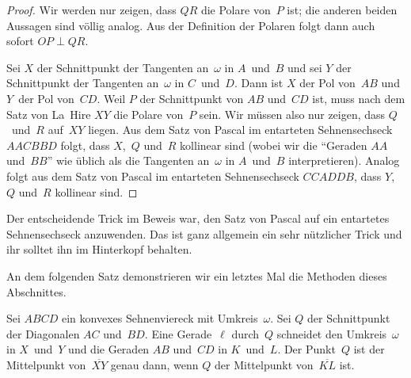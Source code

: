 \begin{proof}
	Wir werden nur zeigen, dass $QR$ die Polare von~$P$ ist; die anderen beiden Aussagen sind völlig analog. Aus der Definition der Polaren folgt dann auch sofort $OP\perp QR$.
	
	Sei $X$ der Schnittpunkt der Tangenten an~$\omega$ in $A$~und~$B$ und sei $Y$ der Schnittpunkt der Tangenten an~$\omega$ in $C$~und~$D$. Dann ist $X$ der Pol von~$AB$ und $Y$~der Pol von~$CD$. Weil $P$ der Schnittpunkt von $AB$ und~$CD$ ist, muss nach dem Satz von La~Hire $XY$ die Polare von~$P$ sein. Wir müssen also nur zeigen, dass $Q$~und~$R$ auf~$XY$ liegen. Aus dem Satz von Pascal im entarteten Sehnensechseck $AACBBD$ folgt, dass $X$,~$Q$ und~$R$ kollinear sind (wobei wir die \enquote{Geraden $AA$ und~$BB$} wie üblich als die Tangenten an~$\omega$ in $A$~und~$B$ interpretieren). Analog folgt aus dem Satz von Pascal im entarteten Sehnensechseck $CCADDB$, dass $Y$,~$Q$ und~$R$ kollinear sind.
\end{proof}

Der entscheidende Trick im Beweis war, den Satz von Pascal auf ein entartetes Sehnensechseck anzuwenden. Das ist ganz allgemein ein sehr nützlicher Trick und ihr solltet ihn im Hinterkopf behalten.

An dem folgenden Satz demonstrieren wir ein letztes Mal die Methoden dieses Abschnittes.

\begin{satzmitnamen}[Schmetterlingssatz]
	Sei $ABCD$ ein konvexes Sehnenviereck mit Umkreis~$\omega$. Sei $Q$ der Schnittpunkt der Diagonalen $AC$ und~$BD$. Eine Gerade~$\ell$ durch~$Q$ schneidet den Umkreis~$\omega$ in $X$~und~$Y$ und die Geraden $AB$ und~$CD$ in $K$~und~$L$. Der Punkt~$Q$ ist der Mittelpunkt von~$\overline{XY}$ genau dann, wenn $Q$ der Mittelpunkt von~$\overline{KL}$ ist.
\end{satzmitnamen}


